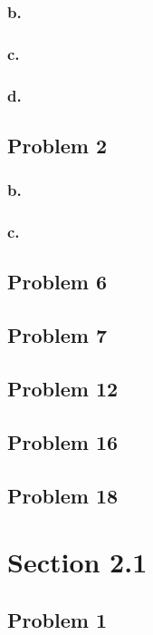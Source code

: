 \documentclass[11pt]{article}
\begin{document}
\subsubsection*{b.}
\subsubsection*{c.}
\subsubsection*{d.}

\subsection*{Problem 2}
\subsubsection*{b.}
\subsubsection*{c.}

\subsection*{Problem 6}

\subsection*{Problem 7}

\subsection*{Problem 12}

\subsection*{Problem 16}

\subsection*{Problem 18}

\section*{Section 2.1}
\subsection*{Problem 1}
\end{document}

